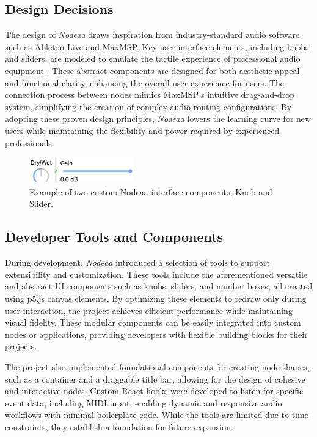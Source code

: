 \documentclass[10pt,twocolumn]{article}
\begin{document}
\subsection{Design Decisions}
The design of \textit{Nodeaa} draws inspiration from industry-standard audio software such as Ableton Live and MaxMSP. Key user interface elements, including knobs and sliders, are modeled to emulate the tactile experience of professional audio equipment \cite{gomez2011usage}. These abstract components are designed for both aesthetic appeal and functional clarity, enhancing the overall user experience for users. The connection process between nodes mimics MaxMSP's intuitive drag-and-drop system, simplifying the creation of complex audio routing configurations. By adopting these proven design principles, \textit{Nodeaa} lowers the learning curve for new users while maintaining the flexibility and power required by experienced professionals.

\begin{figure}[ht]
    \centering
    \includegraphics[width=0.4\textwidth]{images/nodeaaui.png}
    \caption{Example of two custom Nodeaa interface components, Knob and Slider.}
    \label{fig:nodeaaui}
\end{figure}

\subsection{Developer Tools and Components}

During development, \textit{Nodeaa} introduced a selection of tools to support extensibility and customization. These tools include the aforementioned versatile and abstract UI components such as knobs, sliders, and number boxes, all created using p5.js canvas elements. By optimizing these elements to redraw only during user interaction, the project achieves efficient performance while maintaining visual fidelity. These modular components can be easily integrated into custom nodes or applications, providing developers with flexible building blocks for their projects.

The project also implemented foundational components for creating node shapes, such as a container and a draggable title bar, allowing for the design of cohesive and interactive nodes. Custom React hooks were developed to listen for specific event data, including MIDI input, enabling dynamic and responsive audio workflows with minimal boilerplate code. While the tools are limited due to time constraints, they establish a foundation for future expansion.
\end{document}
